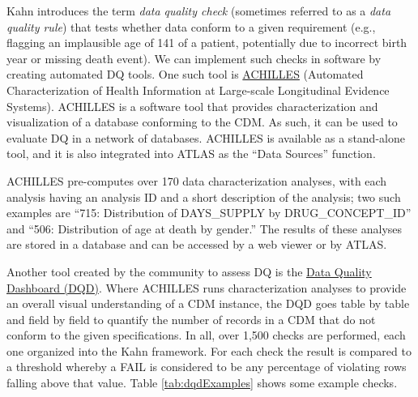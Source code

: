 \documentclass[11pt]{book}
\theoremstyle{definition}
\theoremstyle{definition}
\theoremstyle{definition}
\theoremstyle{remark}
\begin{document}
 

Kahn introduces the term \emph{data quality check} (sometimes referred
to as a \emph{data quality rule}) that tests whether data conform to a
given requirement (e.g., flagging an implausible age of 141 of a
patient, potentially due to incorrect birth year or missing death
event). We can implement such checks in software by creating automated
DQ tools. One such tool is
\href{https://github.com/OHDSI/Achilles}{ACHILLES} (Automated
Characterization of Health Information at Large-scale Longitudinal
Evidence Systems). \citep{huser_methods_2018} ACHILLES is a software
tool that provides characterization and visualization of a database
conforming to the CDM. As such, it can be used to evaluate DQ in a
network of databases. \citep{huser_multisite_2016} ACHILLES is available
as a stand-alone tool, and it is also integrated into ATLAS as the
``Data Sources'' function. 

ACHILLES pre-computes over 170 data characterization analyses, with each
analysis having an analysis ID and a short description of the analysis;
two such examples are ``715: Distribution of DAYS\_SUPPLY by
DRUG\_CONCEPT\_ID'' and ``506: Distribution of age at death by gender.''
The results of these analyses are stored in a database and can be
accessed by a web viewer or by ATLAS.


Another tool created by the community to assess DQ is the
\href{https://github.com/OHDSI/DataQualityDashboard}{Data Quality
Dashboard (DQD)}. Where ACHILLES runs characterization analyses to
provide an overall visual understanding of a CDM instance, the DQD goes
table by table and field by field to quantify the number of records in a
CDM that do not conform to the given specifications. In all, over 1,500
checks are performed, each one organized into the Kahn framework. For
each check the result is compared to a threshold whereby a FAIL is
considered to be any percentage of violating rows falling above that
value. Table \ref{tab:dqdExamples} shows some example checks.
\end{document}
